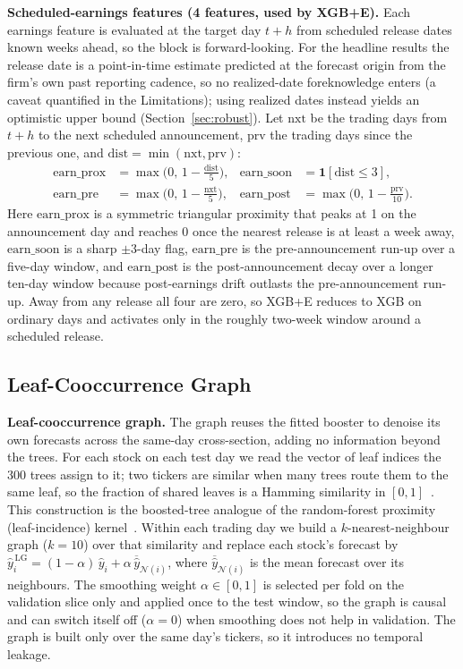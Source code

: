 \documentclass[runningheads]{llncs}
\begin{document}
\textbf{Scheduled-earnings features (4 features, used by XGB+E).} Each earnings feature is evaluated at
the target day $t+h$ from scheduled release dates known weeks ahead, so the block is forward-looking.
For the headline results the release date is a point-in-time estimate predicted at the forecast origin
from the firm's own past reporting cadence, so no realized-date foreknowledge enters (a caveat quantified
in the Limitations); using realized dates instead yields an optimistic upper bound (Section~\ref{sec:robust}).
Let $\mathrm{nxt}$ be the trading days from $t+h$ to the next scheduled announcement,
$\mathrm{prv}$ the trading days since the previous one, and $\mathrm{dist}=\min(\mathrm{nxt},\mathrm{prv})$:
\begin{align}
\mathrm{earn\_prox} &= \max\!\Big(0,\,1-\tfrac{\mathrm{dist}}{5}\Big), &
\mathrm{earn\_soon} &= \mathbf{1}[\mathrm{dist}\le 3],\\
\mathrm{earn\_pre} &= \max\!\Big(0,\,1-\tfrac{\mathrm{nxt}}{5}\Big), &
\mathrm{earn\_post} &= \max\!\Big(0,\,1-\tfrac{\mathrm{prv}}{10}\Big).
\end{align}
Here $\mathrm{earn\_prox}$ is a symmetric triangular proximity that peaks at 1 on the announcement day
and reaches 0 once the nearest release is at least a week away, $\mathrm{earn\_soon}$ is a sharp
$\pm 3$-day flag, $\mathrm{earn\_pre}$ is the pre-announcement run-up over a five-day window, and
$\mathrm{earn\_post}$ is the post-announcement decay over a longer ten-day window because post-earnings
drift outlasts the pre-announcement run-up. Away from any release all four are zero, so XGB+E reduces to
XGB on ordinary days and activates only in the roughly two-week window around a scheduled release.

\subsection{Leaf-Cooccurrence Graph}
\textbf{Leaf-cooccurrence graph.} The graph reuses the fitted booster to denoise its own
forecasts across the same-day cross-section, adding no information beyond the trees. For each stock on
each test day we read the vector of leaf indices the 300 trees assign to it; two tickers are similar
when many trees route them to the same leaf, so the fraction of shared leaves is a Hamming similarity
in $[0,1]$~\cite{chen2016}. This construction is the boosted-tree analogue of the random-forest
proximity (leaf-incidence) kernel~\cite{rhodes2023}. Within each trading day we build a $k$-nearest-neighbour
graph ($k=10$) over that similarity and replace each stock's forecast by
$\hat y_i^{\,\mathrm{LG}}=(1-\alpha)\,\hat y_i+\alpha\,\overline{\hat y}_{\mathcal{N}(i)}$, where
$\overline{\hat y}_{\mathcal{N}(i)}$ is the mean forecast over its neighbours. The smoothing weight
$\alpha\in[0,1]$ is selected per fold on the validation slice only and applied once to the test
window, so the graph is causal and can switch itself off ($\alpha=0$) when smoothing does not help in
validation. The graph is built only over the same day's tickers, so it introduces no temporal leakage.
\end{document}
